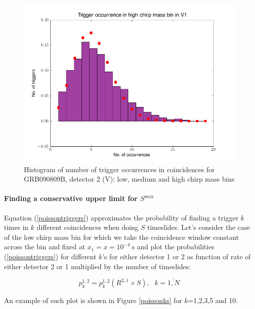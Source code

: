 \documentclass[epsf]{article}
\begin{document}
\begin{figure}[ht!]
\begin{minipage}[b]{0.5\linewidth}
\centering
\includegraphics[scale=0.45]{v1_high_distribution.png}
\end{minipage}
\caption{Histogram of number of trigger occurrences in coincidences for GRB090809B, detector 2 (V): low, medium and high chirp mass bins}
\label{poissonV}
\end{figure}

\paragraph{Finding a conservative upper limit for $S^{\mathrm{max}}$} Equation (\ref{poissontriggers}) approximates the probability of finding a trigger $k$ times in $k$ different coincidences when doing $S$ timeslides. Let's consider the case of the low chirp mass bin for which we take the coincidence window constant across the bin and fixed at $x_1=x=10^{-4}~\mathrm{s}$ and plot the probabilities (\ref{poissontriggers}) for different $k$'s for either detector 1 or 2 as function of rate of either detector 2 or 1 multiplied by the number of timeslides:

\begin{equation}
p^{1,2}_k = p^{1,2}_k(R^{2,1} \times S), ~~~k=\bar{1,N}
\end{equation}

 An example of such plot is shown in Figure \ref{poissonks} for $k$=1,2,3,5 and 10.
\end{document}
